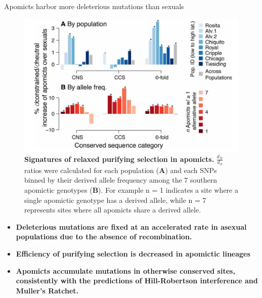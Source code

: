\documentclass[final,20pt]{beamer}
\newlength{\colwidth}
\begin{document}
\begin{frame}[t]
\begin{columns}[t]
\begin{column}{\colwidth}
\begin{alertblock}{Apomicts harbor more deleterious mutations than sexuals}
    \begin{figure}
      \includegraphics[width=\textwidth]{./fig4.png}
      \caption{\textbf{Signatures of relaxed purifying selection in apomicts.}
      $\frac{d_N}{d_S}$ ratios were calculated for each population (\textbf{A}) and each SNPs 
      binned by their derived allele frequency among the 7 southern apomictic genotypes (\textbf{B}).
      For example n = 1 indicates a site where a single apomictic genotype has a derived allele, while n = 7
      represents sites where all apomicts share a derived allele.
      }
    \end{figure}

    \begin{itemize}
      \item \textbf{Deleterious mutations are fixed at an accelerated rate in asexual 
      populations due to the absence of recombination.}
      \item \textbf{Efficiency of purifying selection is decreased in apomictic lineages}
      \item \textbf{Apomicts accumulate mutations in otherwise conserved sites, 
      consistently with the predictions of Hill-Robertson interference and Muller’s
      Ratchet.}
    \end{itemize}
    


\end{alertblock}
\end{column}
\end{columns}
\end{frame}
\end{document}
